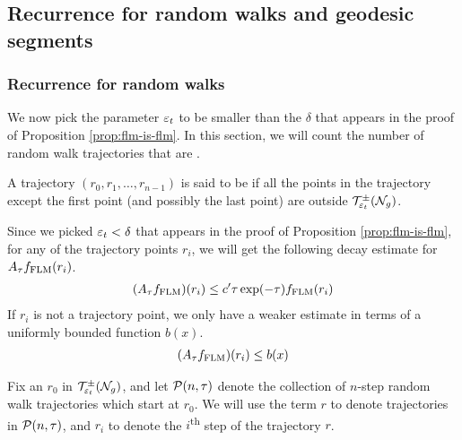\subsection{Recurrence for random walks and geodesic segments}
\label{sec:recurr-rand-walks-1}

\subsubsection{Recurrence for random walks}
\label{sec:recurr-rand-walks-2}

We now pick the parameter $\varepsilon_t$ to be smaller than the $\delta$ that appears in the proof of Proposition \ref{prop:flm-is-flm}.
In this section, we will count the number of random walk trajectories that are \emph{\concave}.

\begin{definition}
  A trajectory $\left( r_0, r_1, \ldots, r_{n-1} \right)$ is said to be \concave if all the points in the trajectory except the first point (and possibly the last point) are outside $\mathcal{T}_{\varepsilon_t}^{\pm}(\mathcal{N}_g)$.
\end{definition}
Since we picked $\varepsilon_t < \delta$ that appears in the proof of Proposition \ref{prop:flm-is-flm}, for any of the \concave trajectory points $r_i$, we will get the following decay estimate for $A_{\tau}f_{\mathrm{FLM}}(r_i)$.
\begin{align*}
  (A_{\tau} f_{\mathrm{FLM}})(r_i) \leq c^{\prime} \tau \exp(-\tau) f_{\mathrm{FLM}}(r_i)
\end{align*}
If $r_i$ is not a \concave trajectory point, we only have a weaker estimate in terms of a uniformly bounded function $b(x)$.
\begin{align*}
  (A_{\tau} f_{\mathrm{FLM}})(r_i) \leq b(x)
\end{align*}


Fix an $r_0$ in $\mathcal{T}_{\varepsilon_t}^{\pm}(\mathcal{N}_g)$, and let $\mathcal{P}(n, \tau)$ denote the collection of $n$-step \concave random walk trajectories which start at $r_0$.
We will use the term $r$ to denote trajectories in $\mathcal{P}(n, \tau)$, and $r_i$ to denote the $i$\textsuperscript{th} step of the trajectory $r$.

